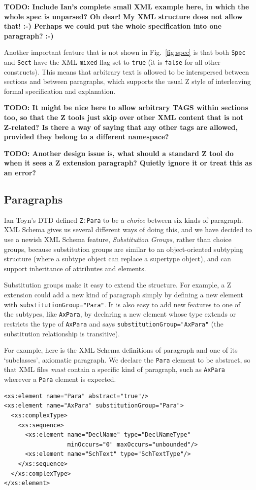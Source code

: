 \documentclass{llncs}  %
\newcommand{\AFont}[1]{\texttt{#1}}
\newcommand{\TODO}[1]{\textbf{TODO: #1}}   %
\begin{document}
\TODO{Include Ian's complete small XML example here, in which
  the whole spec is unparsed?  Oh dear!  My XML structure does not
  allow that!  :-)  Perhaps we could put the whole specification into
  one paragraph?   :-)}

Another important feature that is not shown in Fig.~\ref{fig:spec} is that
both \AFont{Spec} and \AFont{Sect} have the XML \AFont{mixed} flag set to
\AFont{true} (it is \AFont{false} for all other constructs).  This means
that arbitrary text is allowed to be interspersed between sections and
between paragraphs, which supports the usual Z style of interleaving formal
specification and explanation.

\TODO{It might be nice here to allow arbitrary TAGS within sections too, so
  that the Z tools just skip over other XML content that is not Z-related?
  Is there a way of saying that any other tags are allowed,
  provided they belong to a different namespace?}

\TODO{ Another design issue is, what should a standard Z tool do when it
  sees a Z extension paragraph?  Quietly ignore it or treat this as an
  error?  } 


\subsection{Paragraphs}

Ian Toyn's DTD defined \verb!Z:Para! to be a \emph{choice} between six
kinds of paragraph.  XML Schema gives us several different ways of doing
this, and we have decided to use a newish XML Schema feature,
\emph{Substitution Groups}, rather than choice groups, because substitution
groups are similar to an object-oriented subtyping structure (where a
subtype object can replace a supertype object), and can support inheritance
of attributes and elements.   

Substitution groups make it easy to extend the structure.  For example, a Z
extension could add a new kind of paragraph simply by defining a new
element with \texttt{substitutionGroup="Para"}.  It is also easy to add new
features to one of the subtypes, like \texttt{AxPara}, by declaring a new
element whose type extends or restricts the type of \texttt{AxPara} and
says \texttt{substitutionGroup="AxPara"} (the substitution relationship is
transitive).

For example, here is the XML Schema definitions of paragraph and one of its
`subclasses', axiomatic paragraph.  We declare the \texttt{Para} element to
be abstract, so that XML files \emph{must} contain a specific kind of
paragraph, such as \texttt{AxPara} wherever a \texttt{Para} element is
expected.
\begin{verbatim}
<xs:element name="Para" abstract="true"/>
<xs:element name="AxPara" substitutionGroup="Para">
  <xs:complexType>
    <xs:sequence>
      <xs:element name="DeclName" type="DeclNameType" 
                  minOccurs="0" maxOccurs="unbounded"/>
      <xs:element name="SchText" type="SchTextType"/>
    </xs:sequence>
  </xs:complexType>
</xs:element>
\end{verbatim}
\end{document}
